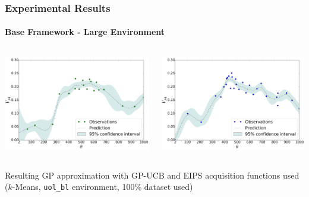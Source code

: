 \begin{frame}
	\frametitle{Experimental Results}
	\framesubtitle{Base Framework - Large Environment}
	\vspace{10pt}
	\begin{columns}
		\begin{column}{0.5\textwidth}
			\includegraphics[width=\linewidth]{../../figures/plots/uol_base/plot_b_00__alg_kmeans_pct_100_acq_ucb.pdf}
		\end{column}
		\begin{column}{0.5\textwidth}
			\includegraphics[width=\linewidth]{../../figures/plots/uol_base/plot_b_00__alg_kmeans_pct_100_acq_eips.pdf}
		\end{column}
	\end{columns}
	\begin{center}
		\footnotesize
		Resulting GP approximation with GP-UCB and EIPS acquisition functions used\\
		($k$-Means, \texttt{uol\_bl} environment, 100\% dataset used)
	\end{center}
\end{frame}

